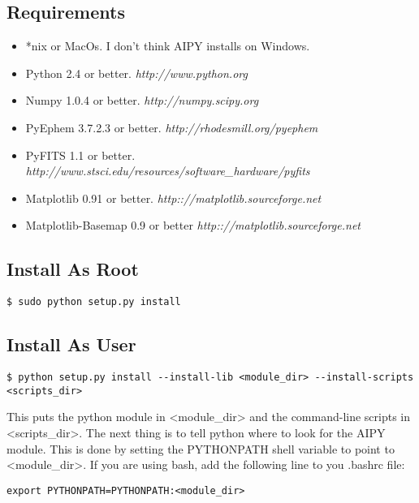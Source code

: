 \documentclass[10pt]{article}
\begin{document}
\subsection{Requirements}

\begin{itemize}
\item[] *nix or MacOs.  I don't think AIPY installs on Windows.
\item[] Python 2.4 or better.  {\it http://www.python.org}
\item[] Numpy 1.0.4 or better. {\it http://numpy.scipy.org}
\item[] PyEphem 3.7.2.3 or better. {\it http://rhodesmill.org/pyephem}
\item[] PyFITS 1.1 or better. {\it http://www.stsci.edu/resources/software\_hardware/pyfits}
\item[] Matplotlib 0.91 or better. {\it http:://matplotlib.sourceforge.net}
\item[] Matplotlib-Basemap 0.9 or better {\it http:://matplotlib.sourceforge.net}
\end{itemize}

\subsection{Install As Root}

\begin{verbatim}
$ sudo python setup.py install
\end{verbatim}

\subsection{Install As User}

\begin{verbatim}
$ python setup.py install --install-lib <module_dir> --install-scripts <scripts_dir>
\end{verbatim}

This puts the python module in <module\_dir> and the command-line scripts
in <scripts\_dir>.  The next thing is to tell python where to look
for the AIPY module.  This is done by setting the PYTHONPATH shell variable
to point to <module\_dir>.  If you are using bash, add the following line
to you .bashrc file:
\begin{verbatim}
export PYTHONPATH=PYTHONPATH:<module_dir>
\end{verbatim}

\clearpage

\clearpage

\clearpage

\clearpage

\clearpage

\clearpage

\clearpage

\clearpage

\clearpage

\clearpage

\clearpage

\clearpage

\clearpage

\end{document}
